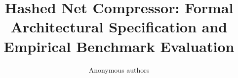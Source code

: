 \title{\textbf{Hashed Net Compressor: Formal Architectural Specification and Empirical Benchmark Evaluation}}

\author{Anonymous authors}

